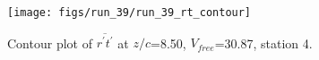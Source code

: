 \begin{figure}[H]
\centering
\texttt{[image: figs/run\_39/run\_39\_rt\_contour]}
\caption{Contour plot of $\overline{r^\prime t^\prime}$ at $z/c$=8.50, $V_{free}$=30.87, station 4.}
\label{fig:run_39_rt_contour}
\end{figure}



